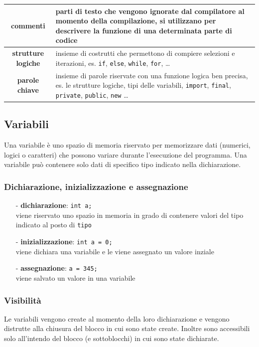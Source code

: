 \documentclass{article}
\begin{document}
\begin{center}
\begin{tabularx}{\textwidth}{c X}
		\textbf{commenti}
		& parti di testo che vengono ignorate dal compilatore al momento della compilazione, si utilizzano per descrivere
		la funzione di una determinata parte di codice \\
		\midrule

		\textbf{strutture logiche}
		& insieme di costrutti che permettono di compiere selezioni e iterazioni, es. \verb|if|, \verb|else|, \verb|while|,
		\verb|for|, \dots \\
		\midrule

		\textbf{parole chiave}
		& insieme di parole riservate con una funzione logica ben precisa, es. le strutture logiche, tipi delle variabili,
		\verb|import|, \verb|final|, \verb|private|, \verb|public|, \verb|new| \dots
	\end{tabularx}
\end{center}


\subsection{Variabili}
Una variabile è uno spazio di memoria riservato per memorizzare dati (numerici, logici o caratteri) che possono variare
durante l'esecuzione del programma. Una variabile può contenere solo dati di specifico tipo indicato nella dichiarazione.

\subsubsection*{Dichiarazione, inizializzazione e assegnazione}
\begin{itemize}[topsep=3pt, itemsep=0pt]
	\item[-] \textbf{dichiarazione}: \verb|int a;| \\
	viene riservato uno spazio in memoria in grado di contenere valori del tipo indicato al posto di \verb|tipo|
	\item[-] \textbf{inizializzazione}: \verb|int a = 0;| \\
	viene dichiara una variabile e le viene assegnato un valore inziale
	\item[-] \textbf{assegnazione}: \verb|a = 345;| \\
	viene salvato un valore in una variabile
\end{itemize}

\subsubsection*{Visibilità}
Le variabili vengono create al momento della loro dichiarazione e vengono distrutte alla chiusura del blocco in cui sono
state create. Inoltre sono accessibili solo all'intendo del blocco (e sottoblocchi) in cui sono state dichiarate.
\end{document}
